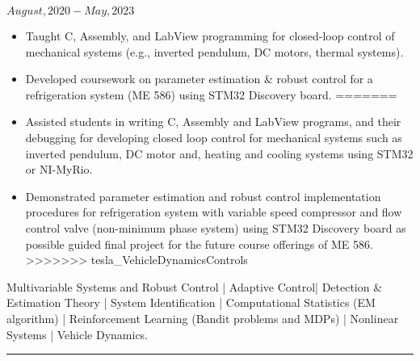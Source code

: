 \noindent {} \hfill $August, 2020 - May, 2023$
\begin{itemize}
<<<<<<< HEAD
        \item Taught C, Assembly, and LabView programming for closed-loop control of mechanical systems (e.g., inverted pendulum, DC motors, thermal systems).

        \item {} Developed coursework on parameter estimation \& robust control for a refrigeration system (ME 586) using STM32 Discovery board.
=======
        \item Assisted students in writing C, Assembly and LabView programs, and their debugging for developing closed loop control for mechanical systems such as inverted pendulum, DC motor and, heating and cooling systems using STM32 or NI-MyRio.

        \item {} Demonstrated parameter estimation and robust control implementation procedures for refrigeration system with variable speed compressor and flow control valve (non-minimum phase system) using STM32 Discovery board as possible guided final project for the future course offerings of ME 586.
>>>>>>> tesla_VehicleDynamicsControls
\end{itemize}
\medskip
 Multivariable Systems and Robust Control |
                        Adaptive Control|
                        Detection \& Estimation Theory |
                        System Identification |
                        Computational Statistics (EM algorithm) |
                        Reinforcement Learning (Bandit problems and MDPs) |
                        Nonlinear Systems | Vehicle Dynamics.


\noindent\rule{\textwidth}{0.4pt}
